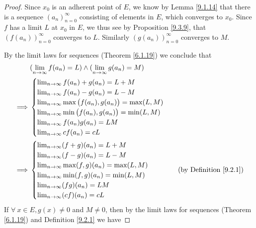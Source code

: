 \begin{proof}
    Since \(x_0\) is an adherent point of \(E\), we know by Lemma \ref{9.1.14} that there is a sequence \((a_n)_{n = 0}^\infty\) consisting of elements in \(E\), which converges to \(x_0\).
    Since \(f\) has a limit \(L\) at \(x_0\) in \(E\), we thus see by Proposition \ref{9.3.9}, that \((f(a_n))_{n = 0}^\infty\) converges to \(L\).
    Similarly \((g(a_n))_{n = 0}^\infty\) converges to \(M\).

    By the limit laws for sequences (Theorem \ref{6.1.19}) we conclude that
    \begin{align*}
                 & (\lim_{n \to \infty} f(a_n) = L) \land (\lim_{n \to \infty} g(a_n) = M)                                      \\
        \implies & \begin{cases}
            \lim_{n \to \infty} f(a_n) + g(a_n) = L + M                   \\
            \lim_{n \to \infty} f(a_n) - g(a_n) = L - M                   \\
            \lim_{n \to \infty} \max\big(f(a_n), g(a_n)\big) = \max(L, M) \\
            \lim_{n \to \infty} \min\big(f(a_n), g(a_n)\big) = \min(L, M) \\
            \lim_{n \to \infty} f(a_n) g(a_n) = LM                        \\
            \lim_{n \to \infty} cf(a_n) = cL
        \end{cases}                                                                                   \\
        \implies & \begin{cases}
            \lim_{n \to \infty} (f + g)(a_n) = L + M         \\
            \lim_{n \to \infty} (f - g)(a_n) = L - M         \\
            \lim_{n \to \infty} \max(f, g)(a_n) = \max(L, M) \\
            \lim_{n \to \infty} \min(f, g)(a_n) = \min(L, M) \\
            \lim_{n \to \infty} (fg)(a_n) = LM               \\
            \lim_{n \to \infty} (cf)(a_n) = cL
        \end{cases}                                              & \text{(by Definition \ref{9.2.1})}
    \end{align*}
    If \(\forall\ x \in E, g(x) \neq 0\) and \(M \neq 0\), then by the limit laws for sequences (Theorem \ref{6.1.19}) and Definition \ref{9.2.1} we have

\end{proof}
